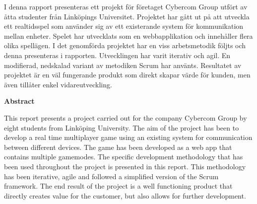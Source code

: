 {\justify
I denna rapport presenteras ett projekt för företaget Cybercom Group utfört av åtta studenter från Linköpings Universitet. Projektet har gått ut på att utveckla ett realtidsspel som använder sig av ett existerande system för kommunikation mellan enheter. Spelet har utvecklats som en webbapplikation och innehåller flera olika spellägen. I det genomförda projektet har en viss arbetsmetodik följts och denna presenteras i rapporten. Utvecklingen har varit iterativ och agil. En modifierad, nedskalad variant av metodiken Scrum har använts. Resultatet av projektet är en väl fungerande produkt som direkt skapar värde för kunden, men även tillåter enkel vidareutveckling.\\[1in]\par
}
{\centering
  \indent\textbf{Abstract}\par
}
This report presents a project carried out for the company Cybercom Group by eight students from Linköping University. The aim of the project has been to develop a real time multiplayer game using an existing system for communication between different devices. The game has been developed as a web app that contains multiple gamemodes. The specific development methodology that has been used throughout the project is presented in this report. This methodology has been iterative, agile and followed a simplified version of the Scrum framework. The end result of the project is a well functioning product that directly creates value for the customer, but also allows for further development.
